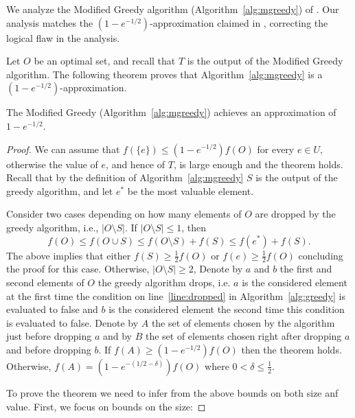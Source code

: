 We analyze the Modified Greedy algorithm (Algorithm~\ref{alg:mgreedy}) of \cite{khuller1999budgeted}.
Our analysis matches the $(1 - e^{-1/2})$-approximation claimed in \cite[]{khuller1999budgeted}, correcting the logical flaw in the analysis.

Let $O$ be an optimal set, and recall that $T$ is the output of the Modified Greedy algorithm.
The following theorem proves that Algorithm~\ref{alg:mgreedy} is a $(1-e^{-1/2})$-approximation.

\begin{theorem}
	\label{theorem:mgreedy}
	The Modified Greedy (Algorithm~\ref{alg:mgreedy}) achieves an approximation of $1 - e^{-1/2}$.
\end{theorem}

\begin{proof}
	We can assume that $f(\{e\}) \leq (1 - e^{-1/2})f(O)$ for every $e \in U$, otherwise the value of $e$, and hence of $T$, is large enough and the theorem holds.
	Recall that by the definition of Algorithm~\ref{alg:mgreedy} $S$ is the output of the greedy algorithm, and let $e^*$ be the most valuable element.
	
	Consider two cases depending on how many elements of $O$ are dropped by the greedy algorithm, i.e., $|O \setminus S|$.
	If $|O \setminus S| \leq 1$, then 
	$$
	f(O) \leq f(O \cup S) \leq f(O \setminus S) + f(S) \leq f(e^*) + f(S).
	$$
	The above implies that either $f(S) \geq \frac{1}{2}f(O)$ or $f(e) \geq \frac{1}{2}f(O)$ concluding the proof for this case.
	Otherwise, $|O \setminus S| \geq 2$,
	Denote by $a$ and $b$ the first and second elements of $O$ the greedy algorithm drops, i.e. $a$ is the considered element at the first time the condition on line~\ref{line:dropped} in Algorithm~\ref{alg:greedy} is evaluated to false and $b$ is the considered element the second time this condition is evaluated to false.
	Denote by $A$ the set of elements chosen by the algorithm just before dropping $a$ and by
	$B$ the set of elements chosen right after dropping $a$ and before dropping $b$.
	If $f(A) \geq (1 - e^{-1/2})f(O)$ then the theorem holds.
	Otherwise, $f(A) = (1 - e^{-(1/2 - \delta)})f(O)$ where $0 < \delta \leq \frac{1}{2}$.

	To prove the theorem we need to infer from the above bounds on both size anf value.
	First, we focus on bounds on the size:


\end{proof}
